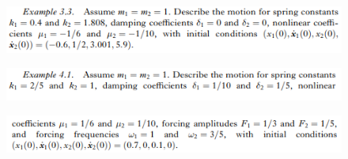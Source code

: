 \documentclass{article}
\begin{document}
\begin{figure}[H]
    \includegraphics[width=1\textwidth]{Ejemplo3-3.PNG}
    \centering
    \label{Cod}
\end{figure}
\begin{figure}[H]
    \includegraphics[width=1\textwidth]{Ejemplo4-1-1.PNG}
    \centering
    \label{Cod}
\end{figure}
\begin{figure}[H]
    \includegraphics[width=1\textwidth]{Ejemplo4-1-2.PNG}
    \centering
    \label{Cod}
\end{figure}
\end{document}
